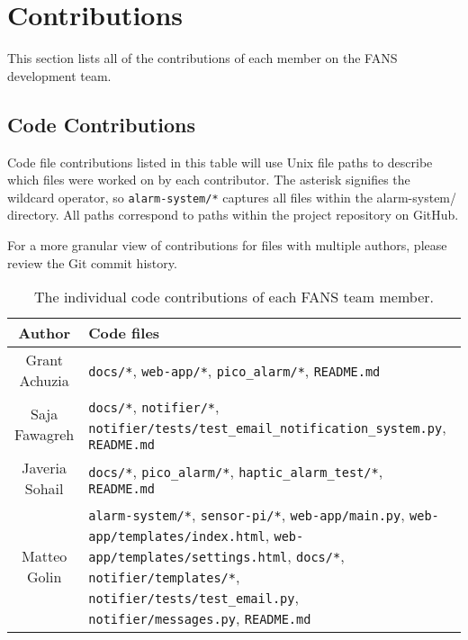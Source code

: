 \section{Contributions}

This section lists all of the contributions of each member on the FANS development team.

\subsection{Code Contributions}

Code file contributions listed in this table will use Unix file paths to describe which files were worked on by each
contributor. The asterisk signifies the wildcard operator, so \texttt{alarm-system/*} captures all files within the
alarm-system/ directory. All paths correspond to paths within the project repository on GitHub.

For a more granular view of contributions for files with multiple authors, please review the Git commit history.

\begin{table}[H]
    \centering
    \footnotesize
    \begin{tabular}{| c | p{5in} |}
        \hline
        Author         & Code files                                                                 \\
        \hline
        Grant Achuzia  &
        \texttt{docs/*}, \texttt{web-app/*}, \texttt{pico\_alarm/*}, \texttt{README.md}             \\
        \hline
        Saja Fawagreh  &
        \texttt{docs/*}, \texttt{notifier/*}, \texttt{notifier/tests/test\_email\_notification\_system.py},
        \texttt{README.md}                                                                          \\
        \hline
        Javeria Sohail &
        \texttt{docs/*}, \texttt{pico\_alarm/*}, \texttt{haptic\_alarm\_test/*}, \texttt{README.md} \\
        \hline
        Matteo Golin   &
        \texttt{alarm-system/*}, \texttt{sensor-pi/*}, \texttt{web-app/main.py},
        \texttt{web-app/templates/index.html}, \texttt{web-app/templates/settings.html}, \texttt{docs/*},
        \texttt{notifier/templates/*}, \texttt{notifier/tests/test\_email.py}, \texttt{notifier/messages.py},
        \texttt{README.md}                                                                          \\
        \hline
    \end{tabular}
    \caption{The individual code contributions of each FANS team member.}
\end{table}

